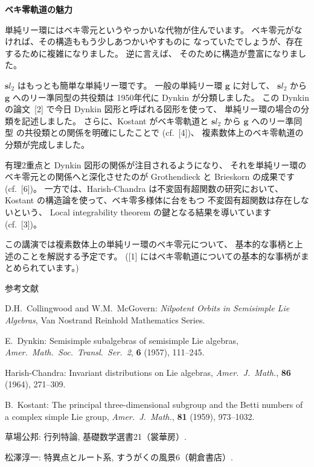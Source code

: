 \documentclass[uplatex,dvipdfmx]{jlreq}
\begin{document}
\begin{center}
{\large\bfseries ベキ零軌道の魅力}\\[6pt]
\hspace*{\fill}{\large\bfseries 関口 次郎（東京農工大学 工学部）}
\end{center}

単純リー環にはベキ零元というやっかいな代物が住んでいます。
ベキ零元がなければ、その構造ももう少しあつかいやすものに
なっていたでしょうが、存在するために複雑になりました。
逆に言えば、
そのために構造が豊富になりました。

${\mathbf sl}_2$ はもっとも簡単な単純リー環です。
一般の単純リー環 ${\mathbf g}$ に対して、
${\mathbf sl}_2$ から ${\mathbf g}$ へのリー準同型の共役類は
1950年代に Dynkin が分類しました。
この Dynkin の論文~[2] で今日 Dynkin 図形と呼ばれる図形を使って、
単純リー環の場合の分類を記述しました。
さらに、Kostant がベキ零軌道と ${\mathbf sl}_2$ から ${\mathbf g}$
へのリー準同型
の共役類との関係を明確にしたことで (cf.~[4])、
複素数体上のベキ零軌道の分類が完成しました。

有理2重点と Dynkin 図形の関係が注目されるようになり、
それを単純リー環のベキ零元との関係へと深化させたのが
Grothendieck と Brieskorn の成果です (cf.~[6])。
一方では、Harish-Chandra は不変固有超関数の研究において、
Kostant の構造論を使って、ベキ零多様体に台をもつ
不変固有超関数は存在しないという、
Local integrability theorem の鍵となる結果を導いています
(cf.~[3])。

この講演では複素数体上の単純リー環のベキ零元について、
基本的な事柄と上述のことを解説する予定です。
([1] にはベキ零軌道についての基本的な事柄がまとめられています。)

\begin{center}\textsc{参考文献}\end{center}
\begin{enumerate}[{[1]}]
  \item D.H.~Collingwood and W.M.~McGovern:
    \textit{Nilpotent Orbits in Semisimple Lie Algebras},
    Van Nostrand Reinhold Mathematics Series.
  \item E.~Dynkin:
    Semisimple subalgebras of semisimple Lie algebras,
    \textit{Amer.\ Math.\ Soc.\ Transl.\ Ser.~2}, \textbf{6} (1957), 111--245.
  \item Harish-Chandra:
    Invariant distributions on Lie algebras,
    \textit{Amer.\ J.\ Math.}, \textbf{86} (1964), 271--309.
  \item B.~Kostant:
    The principal three-dimensional subgroup and
    the Betti numbers of a complex simple Lie group,
    \textit{Amer.\ J.\ Math.}, \textbf{81} (1959), 973--1032.
  \item 草場公邦:
    行列特論, 基礎数学選書21（裳華房）.
  \item 松澤淳一:
    特異点とルート系, すうがくの風景6（朝倉書店）.
\end{enumerate}
\end{document}
